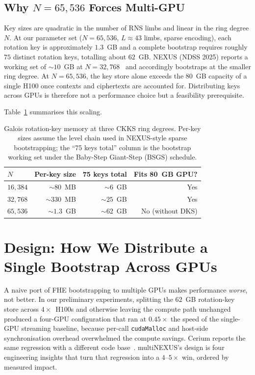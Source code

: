 \documentclass[conference]{IEEEtran}
\begin{document}
\subsection{Why $N{=}65{,}536$ Forces Multi-GPU}

Key sizes are quadratic in the number of RNS limbs and linear in the
ring degree $N$. At our parameter set ($N{=}65{,}536$,
$L \approx 43$ limbs, sparse encoding), each rotation key is
approximately $1.3$~GB and a complete bootstrap requires roughly
$75$ distinct rotation keys, totalling about $62$~GB. NEXUS
(NDSS 2025) reports a working set of $\sim$$10$~GB at
$N{=}32{,}768$~\cite{Zhang2025} and accordingly bootstraps at the
smaller ring degree. At $N{=}65{,}536$, the key store alone exceeds
the $80$~GB capacity of a single H100 once contexts and ciphertexts
are accounted for. Distributing keys across GPUs is therefore not a
performance choice but a feasibility prerequisite.

Table~\ref{tab:keysize} summarises this scaling.

\begin{table}[h]
\centering
\caption{Galois rotation-key memory at three CKKS ring degrees.
Per-key sizes assume the level chain used in NEXUS-style sparse
bootstrapping; the ``75 keys total'' column is the bootstrap working
set under the Baby-Step Giant-Step (BSGS) schedule.}
\label{tab:keysize}
\begin{tabular}{lrrr}
\toprule
$N$ & Per-key size & 75 keys total & Fits 80~GB GPU? \\
\midrule
$16{,}384$ & ${\sim}80$~MB  & ${\sim}6$~GB  & Yes \\
$32{,}768$ & ${\sim}330$~MB & ${\sim}25$~GB & Yes \\
$65{,}536$ & ${\sim}1.3$~GB & ${\sim}62$~GB & No (without DKS) \\
\bottomrule
\end{tabular}
\end{table}

\section{Design: How We Distribute a Single Bootstrap Across GPUs}
\label{sec:design}

A naive port of FHE bootstrapping to multiple GPUs makes performance
\emph{worse}, not better. In our preliminary experiments, splitting the
$62$~GB rotation-key store across $4\times$~H100s and otherwise leaving
the compute path unchanged produced a four-GPU configuration that ran
at $0.45\times$ the speed of the single-GPU streaming baseline, because
per-call \texttt{cudaMalloc} and host-side synchronisation overhead
overwhelmed the compute savings. Cerium reports the same regression
with a different code base~\cite{Jayashankar2025-arxiv}. multiNEXUS's
design is four engineering insights that turn that regression into a
$4$--$5\times$ win, ordered by measured impact.
\end{document}
